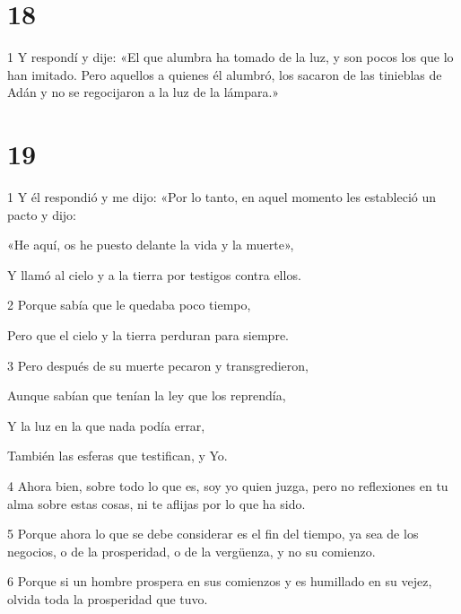 \chapter{18}

\par 1 Y respondí y dije: «El que alumbra ha tomado de la luz, y son pocos los que lo han imitado. Pero aquellos a quienes él alumbró, los sacaron de las tinieblas de Adán y no se regocijaron a la luz de la lámpara.»

\chapter{19}

\par 1 Y él respondió y me dijo: «Por lo tanto, en aquel momento les estableció un pacto y dijo:

\par «He aquí, os he puesto delante la vida y la muerte»,

\par Y llamó al cielo y a la tierra por testigos contra ellos.

\par 2 Porque sabía que le quedaba poco tiempo,

\par Pero que el cielo y la tierra perduran para siempre.

\par 3 Pero después de su muerte pecaron y transgredieron,

\par Aunque sabían que tenían la ley que los reprendía,

\par Y la luz en la que nada podía errar,

\par También las esferas que testifican, y Yo.

\par 4 Ahora bien, sobre todo lo que es, soy yo quien juzga, pero no reflexiones en tu alma sobre estas cosas, ni te aflijas por lo que ha sido.

\par 5 Porque ahora lo que se debe considerar es el fin del tiempo, ya sea de los negocios, o de la prosperidad, o de la vergüenza, y no su comienzo.

\par 6 Porque si un hombre prospera en sus comienzos y es humillado en su vejez, olvida toda la prosperidad que tuvo.

